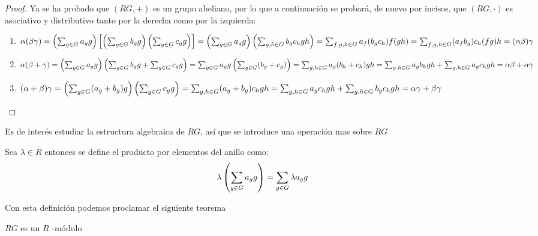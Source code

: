 \begin{proof}
Ya se ha probado que $(RG,+)$ es un grupo abeliano, por lo que a continuación se probará, de nuevo por incisos, que $(RG,\cdot)$ es asociativo y distributivo tanto por la derecha como por la izquierda:
\begin{enumerate}
\item $\alpha(\beta\gamma) = \left(\sum_{g \in G} a_{g} g\right)\left[\left(\sum_{g \in G} b_{g} g\right)\left(\sum_{g \in G} c_{g} g\right)\right] = \left(\sum_{g \in G} a_{g} g\right)\left(\sum_{g,h\in G}b_gc_hgh\right) = \sum_{f,g,h \in G}a_f(b_gc_h)f(gh) = \sum_{f,g,h \in G} (a_fb_g)c_h(fg)h = (\alpha\beta)\gamma$
\item  $\alpha(\beta + \gamma) = \left( \sum_{g \in G} a_{g} g \right) \left(\sum_{g \in G} b_{g} g + \sum_{g \in G} c_{g} g \right) = \sum_{g \in G} a_{g} g \left( \sum_{g \in G}(b_g+c_g)\right) = \sum_{g,h \in G}a_g(b_h+c_h)gh  = \sum_{g,h \in G} a_gb_hgh + \sum_{g,h \in G} a_gc_hgh = \alpha\beta + \alpha\gamma$  
\item $(\alpha + \beta)\gamma = \left( \sum_{g\in G}(a_g+b_g)g\right) \left(\sum_{g \in G} c_{g} g\right) = \sum_{g,h \in G} (a_g+b_g)c_hgh = \sum_{g,h \in G}a_gc_hgh + \sum_{g,h\in G}b_gc_hgh = \alpha\gamma + \beta\gamma$ \qedhere


\end{enumerate}
\end{proof}


Es de interés estudiar la estructura algebraica de $RG$, así que se introduce una operación mas sobre $RG$


\begin{definicion}
Sea $\lambda \in R$ entonces se define el producto por elementos del anillo como: 
\begin{equation}
\lambda \left(\sum_{g \in G} a_{g} g\right) = \sum_{g \in G} \lambda a_{g} g
\end{equation}
\end{definicion}

Con esta definición podemos proclamar el siguiente teorema

\begin{teorema}
$RG$ es un $R$ -módulo
\end{teorema}


